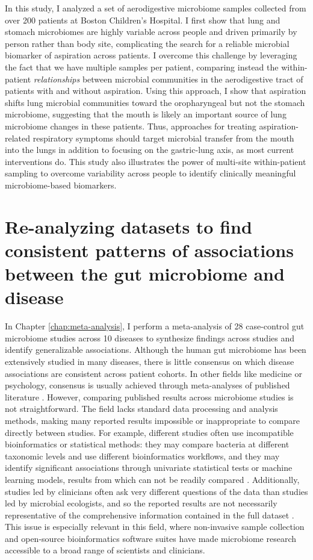 In this study, I analyzed a set of aerodigestive microbiome samples collected from over 200 patients at Boston Children's Hospital.
I first show that lung and stomach microbiomes are highly variable across people and driven primarily by person rather than body site, complicating the search for a reliable microbial biomarker of aspiration across patients.
I overcome this challenge by leveraging the fact that we have multiple samples per patient, comparing instead the within-patient \textit{relationships} between microbial communities in the aerodigestive tract of patients with and without aspiration.
Using this approach, I show that aspiration shifts lung microbial communities toward the oropharyngeal but not the stomach microbiome, suggesting that the mouth is likely an important source of lung microbiome changes in these patients.
Thus, approaches for treating aspiration-related respiratory symptoms should target microbial transfer from the mouth into the lungs in addition to focusing on the gastric-lung axis, as most current interventions do.
This study also illustrates the power of multi-site within-patient sampling to overcome variability across people to identify clinically meaningful microbiome-based biomarkers.

\section{Re-analyzing datasets to find consistent patterns of associations between the gut microbiome and disease}

In Chapter \ref{chap:meta-analysis}, I perform a meta-analysis of 28 case-control gut microbiome studies across 10 diseases to synthesize findings across studies and identify generalizable associations.
Although the human gut microbiome has been extensively studied in many diseases, there is little consensus on which disease associations are consistent across patient cohorts.
In other fields like medicine or psychology, consensus is usually achieved through meta-analyses of published literature \cite{glass-1976}.
However, comparing published results across microbiome studies is not straightforward.
The field lacks standard data processing and analysis methods, making many reported results impossible or inappropriate to compare directly between studies.
For example, different studies often use incompatible bioinformatics or statistical methods: they may compare bacteria at different taxonomic levels and use different bioinformatics workflows, and they may identify significant associations through univariate statistical tests or machine learning models, results from which can not be readily compared \cite{edd-singh,crc-baxter,crc-zeller,ob-zupancic}.
Additionally, studies led by clinicians often ask very different questions of the data than studies led by microbial ecologists, and so the reported results are not necessarily representative of the comprehensive information contained in the full dataset \cite{asd-son,ra-scher,nash-wong}.
This issue is especially relevant in this field, where non-invasive sample collection and open-source bioinformatics software suites have made microbiome research accessible to a broad range of scientists and clinicians.

